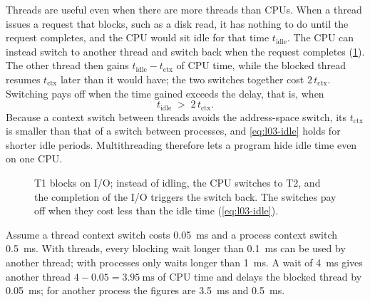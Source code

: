 \documentclass[../main.tex]{subfiles}
\begin{document}
Threads are useful even when there are more threads than CPUs.  When a
thread issues a request that blocks, such as a disk read, it has nothing to
do until the request completes, and the CPU would sit idle for that time
$t_{\mathrm{idle}}$.  The CPU can instead switch to another thread and
switch back when the request completes (\cref{fig:l03-idle-time}).  The
other thread then gains $t_{\mathrm{idle}} - t_{\mathrm{ctx}}$ of CPU time,
while the blocked thread resumes $t_{\mathrm{ctx}}$ later than it would
have; the two switches together cost $2\,t_{\mathrm{ctx}}$.  Switching pays
off when the time gained exceeds the delay, that is, when
\begin{equation}
  t_{\mathrm{idle}} \;>\; 2\, t_{\mathrm{ctx}} .
  \label{eq:l03-idle}
\end{equation}
Because a context switch between threads avoids the address-space switch,
its $t_{\mathrm{ctx}}$ is smaller than that of a switch between processes,
and \cref{eq:l03-idle} holds for shorter idle periods.  Multithreading
therefore lets a program hide idle time even on one CPU.

\begin{figure}[htbp]
  \centering
  
  \caption{T1 blocks on I/O; instead of idling, the CPU switches to T2, and
    the completion of the I/O triggers the switch back.  The switches pay
    off when they cost less than the idle time (\cref{eq:l03-idle}).}
  \label{fig:l03-idle-time}
\end{figure}

\begin{example}
  Assume a thread context switch costs \SI{0.05}{\milli\second} and a
  process context switch \SI{0.5}{\milli\second}.  With threads, every
  blocking wait longer than \SI{0.1}{\milli\second} can be used by
  another thread; with processes only waits longer than
  \SI{1}{\milli\second}.  A wait of \SI{4}{\milli\second} gives another
  thread $4 - 0.05 = \SI{3.95}{\milli\second}$ of CPU time and delays the
  blocked thread by \SI{0.05}{\milli\second}; for another process the
  figures are \SI{3.5}{\milli\second} and
  \SI{0.5}{\milli\second}.
\end{example}
\end{document}
